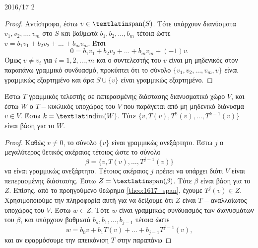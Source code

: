 \documentclass[a4paper,11pt]{article}
\begin{document}
\begin{solution}{2016/17 2}
\begin{proof}
        Αντίστροφα, έστω \( v \in \text{\tl{span}}(S) \). Τότε υπάρχουν
        διανύσματα \( v_1, v_2, \dots, v_m \) στο \( S \) και βαθμωτά \( b_1,
        b_2, \dots, b_m \) τέτοια ώστε \( v = b_1v_1 + b_2v_2 + \dots + b_mv_m
        \). Έτσι
        \begin{equation*}
            0 = b_1v_1 + b_2v_2 + \dots + b_mv_m + (-1)v.
        \end{equation*}
        Όμως \( v \neq v_i \) για \( i = 1,2,\dots,m \) και ο συντελεστής του \(
        v \) είναι μη μηδενικός στον παραπάνω γραμμικό συνδυασμό, προκύπτει ότι
        το σύνολο \( \{v_1, v_2, \dots, v_m, v \} \) είναι γραμμικώς εξαρτημένο
        και άρα \( S \cup \{v\} \) είναι γραμμικώς εξαρτημένο.
    \end{proof}
    \begin{thrm}
        \label{theo:1617_base}
        Έστω \( T \) γραμμικός τελεστής σε πεπερασμένης διάστασης διανυσματικό
        χώρο \( V \), και έστω \( W \) ο \( T-\)κυκλικός υποχώρος του \( V \)
        που παράγεται από μη μηδενικό διάνυσμα \( v \in V \). Έστω \( k =
        \text{\tl{dim}}(W) \). Τότε \( \{v, T(v), T^2(v), \dots, T^{k-1}(v) \}
        \) είναι βάση για το \( W \).
    \end{thrm}
    \begin{proof}
        Καθώς \( v \neq 0 \), το σύνολο \( \{v\} \)
        είναι γραμμικώς ανεξάρτητο.  Έστω \( j \) ο μεγαλύτερος θετικός ακέραιος
        τέτοιος ώστε το σύνολο
        \begin{equation*}
            \beta = \{ v, T(v), \dots, T^{j-1}(v) \}
        \end{equation*}
        να είναι γραμμικώς ανεξάρτητο. Τέτοιος ακέραιος \( j \) πρέπει να
        υπάρχει διότι \( V \) είναι πεπερασμένης διάστασης. Έστω \( Z =
        \text{\tl{span}}(\beta) \). Τότε \( \beta \) είναι βάση για το \( Z \).
        Επίσης, από το προηγούμενο θεώρημα \ref{theo:1617_span}, έχουμε \( T^j(v) \in Z \).
        Χρησιμοποιούμε την πληροφορία αυτή για να δείξουμε ότι \( Z \) είναι
        \(T-\)αναλλοίωτος υποχώρος του \( V \). Έστω \( w \in Z \). Τότε \( w \)
        είναι γραμμικώς συνδυασμός των διανυσμάτων του \( \beta \), και υπάρχουν
        βαθμωτά \( b_o, b_1, \dots, b_{j-1} \) τέτοια ώστε
        \begin{equation*}
            w = b_0v + b_1T(v) + \dots + b_{j-1}T^{j-1}(v),
        \end{equation*}
        και αν εφαρμόσουμε την απεικόνιση \( T \) στην παραπάνω

\end{proof}
\end{solution}
\end{document}
